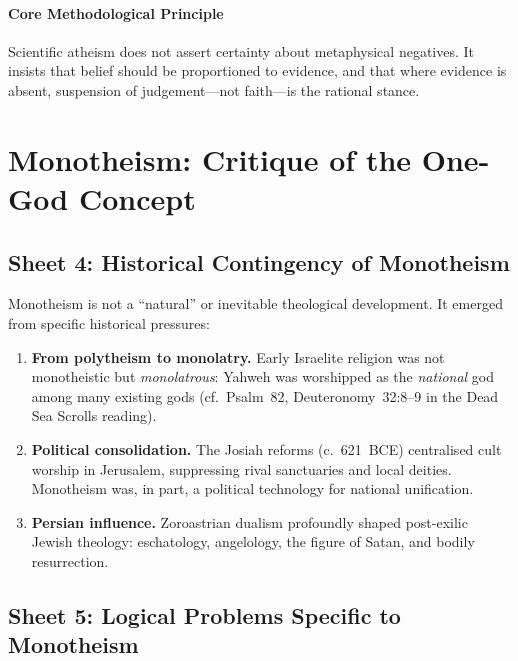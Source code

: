 \paragraph{Core Methodological Principle}
Scientific atheism does not assert certainty about metaphysical negatives.
It insists that belief should be proportioned to evidence, and that where
evidence is absent, suspension of judgement---not faith---is the rational
stance.

\section{Monotheism: Critique of the One-God Concept}

\subsection{Sheet 4: Historical Contingency of Monotheism}

Monotheism is not a ``natural'' or inevitable theological development.  It
emerged from specific historical pressures:

\begin{enumerate}
  \item \textbf{From polytheism to monolatry.}
    Early Israelite religion was not monotheistic but
    \emph{monolatrous}: Yahweh was
    worshipped as the \emph{national} god among many existing gods
    (cf.\ Psalm~82, Deuteronomy~32:8--9 in the Dead Sea Scrolls reading).
  \item \textbf{Political consolidation.}
    The Josiah reforms (c.~621~BCE) centralised cult
    worship in Jerusalem, suppressing rival sanctuaries and local deities.
    Monotheism was, in part, a political technology for national unification.
  \item \textbf{Persian influence.}
    Zoroastrian dualism profoundly shaped post-exilic
    Jewish theology: eschatology, angelology, the figure
    of Satan, and bodily resurrection.
\end{enumerate}

\subsection{Sheet 5: Logical Problems Specific to Monotheism}

